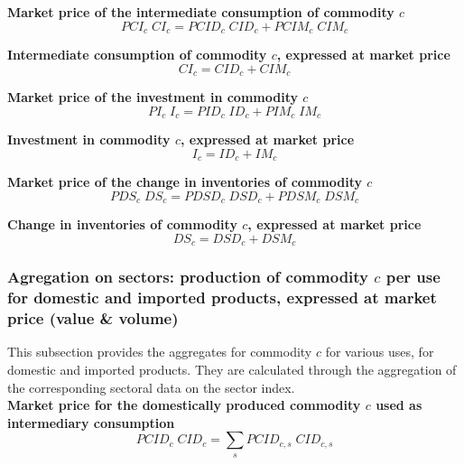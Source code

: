 \documentclass[12pt]{article}
\numberwithin{equation}{section}
\begin{document}
\noindent\textbf{Market price of the intermediate consumption of commodity $c$} \\
\begin{dmath}
PCI_{c} \; CI_{c} = PCID_{c} \; CID_{c} + PCIM_{c} \; CIM_{c}
\end{dmath}

\noindent\textbf{Intermediate consumption of commodity $c$, expressed at market price} \\
\begin{dmath}
CI_{c} = CID_{c} + CIM_{c}
\end{dmath}

\noindent\textbf{Market price of the investment in commodity $c$} \\
\begin{dmath}
PI_{c} \; I_{c} = PID_{c} \; ID_{c} + PIM_{c} \; IM_{c}
\end{dmath}

\noindent\textbf{Investment in commodity $c$, expressed at market price} \\
\begin{dmath}
I_{c} = ID_{c} + IM_{c}
\end{dmath}

\noindent\textbf{Market price of the change in inventories of commodity $c$} \\
\begin{dmath}
PDS_{c} \; DS_{c} = PDSD_{c} \; DSD_{c} + PDSM_{c} \; DSM_{c}
\end{dmath}

\noindent\textbf{Change in inventories of commodity $c$, expressed at market price} \\
\begin{dmath}
DS_{c} = DSD_{c} + DSM_{c}
\end{dmath}



\subsubsection{Agregation on sectors: production of commodity $c$ per use for domestic and imported products, expressed at market price (value \& volume)}


This subsection provides the aggregates for commodity $c$ for various uses, for domestic and imported products. They are calculated through the aggregation of the corresponding sectoral data on the sector index. \\

\noindent\textbf{Market price for the domestically produced commodity $c$ used as intermediary consumption} \\
\begin{dmath}
PCID_{c} \; CID_{c} = \sum_{s} PCID_{c, s} \; CID_{c, s}
\end{dmath}
\end{document}
